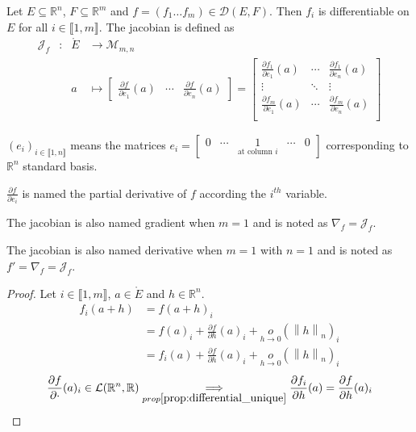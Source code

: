 \documentclass[11pt,en]{elegantpaper}
\newcommand{\norm}[1]{\left\lVert#1\right\rVert}
\newcommand{\Real}{\mathbb{R}}
\begin{document}
\begin{definition}
  Let $E \subseteq \Real^n$, $F \subseteq \Real^m$ and $f = (f_1 \ldots f_m) \in \mathcal{D}(E,F)$.
  Then $f_i$ is differentiable on $E$ for all $i \in \llbracket 1,m \rrbracket$. The jacobian is defined as \begin{equation}
    \begin{array}{llll}
      \mathcal{J}_f & : & \mathring{E} & \longrightarrow \mathcal{M}_{m,n} \\
        &   & a & \longmapsto \begin{bmatrix}
        \frac{\partial f}{\partial e_1}(a) & \cdots & \frac{\partial f}{\partial e_n}(a)
      \end{bmatrix} = \begin{bmatrix}
        \frac{\partial f_1}{\partial e_1}(a) & \cdots & \frac{\partial f_1}{\partial e_n}(a) \\
        \vdots & \ddots & \vdots \\
        \frac{\partial f_m}{\partial e_1}(a) & \cdots & \frac{\partial f_m}{\partial e_n}(a) \\
      \end{bmatrix}
    \end{array}
  \end{equation}

  $(e_i)_{i \in \llbracket 1,n \rrbracket}$ means the matrices $e_i = \begin{bmatrix}
    0 & \cdots & \underset{\text{at column $i$}} 1 & \cdots & 0
  \end{bmatrix}$ corresponding to $\Real^n$ standard basis. \par
  $\frac{\partial f}{\partial e_i}$ is named the partial derivative of $f$ according the $i^{th}$ variable. \par
  The jacobian is also named gradient when $m=1$ and is noted as $\nabla_f = \mathcal{J}_f$. \par
  The jacobian is also named derivative when $m=1$ with $n=1$ and is noted as $f' = \nabla_f = \mathcal{J}_f$.
\end{definition}

\begin{proof}
  Let $i \in \llbracket 1,m \rrbracket$, $a \in \mathring{E}$ and $h \in \Real^n$.
  \begin{equation*}
    \begin{split}
      f_i (a + h) & = f(a + h)_i \\
      & = f(a)_i + \frac{\partial f}{\partial h}(a)_i + \underset{h \to 0}o(\norm h _n)_i \\
      & = f_i(a) + \frac{\partial f}{\partial h}(a)_i + \underset{h \to 0}o(\norm h _n)_i
    \end{split}
  \end{equation*}
  \begin{equation*}
    \frac{\partial f}{\partial \cdot}(a)_i \in \mathcal{L}(\Real^n,\Real) \underset{prop\ref{prop:differential_unique}}\implies \frac{\partial f_i}{\partial h}(a) = \frac{\partial f}{\partial h}(a)_i
  \end{equation*}
\end{proof}
\end{document}
